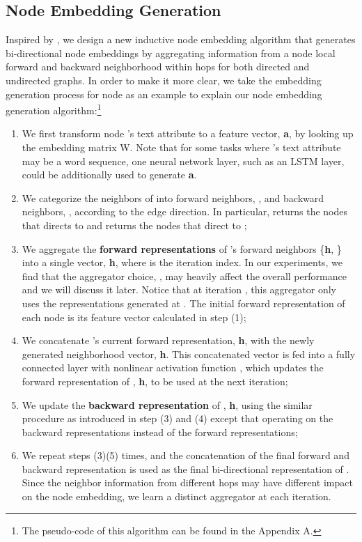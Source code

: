 \documentclass{article} \usepackage{iclr2019_conference,times}
\begin{document}
\subsection{Node Embedding Generation}
Inspired by \cite{hamilton2017inductive}, we design a new inductive node embedding algorithm that generates bi-directional node embeddings by aggregating information from a node local forward and backward neighborhood within  hops for both directed and undirected graphs.
In order to make it more clear, we take the embedding generation process for node  as an example to explain our node embedding generation algorithm:\footnote{The pseudo-code of this algorithm can be found in the Appendix A.}
\begin{enumerate}[1)]
    \item We first transform node 's text attribute to a feature vector, \textbf{a}, by looking up the embedding matrix W. Note that for some tasks where 's text attribute may be a word sequence, one neural network layer, such as an LSTM layer, could be additionally used to generate \textbf{a}.
    \item We categorize the neighbors of  into forward neighbors, , and backward neighbors, , according to the edge direction. In particular,  returns the nodes that  directs to and  returns the nodes that direct to ;
    \item We aggregate the \textbf{forward representations} of 's forward neighbors \{\textbf{h}, \} into a single vector, \textbf{h}, where  is the iteration index.
    In our experiments, we find that the aggregator choice, , may heavily affect the overall performance and we will discuss it later.
    Notice that at iteration , this aggregator only uses the representations generated at . The initial forward representation of each node is its feature vector calculated in step (1);
    \item We concatenate 's current forward representation, \textbf{h}, with the newly generated neighborhood vector, \textbf{h}. This concatenated vector is fed into a fully connected layer with nonlinear activation function , which updates the forward representation of , \textbf{h}, to be used at the next iteration;
    \item We update the \textbf{backward representation} of , \textbf{h}, using the similar procedure as introduced in step (3) and (4) except that operating on the backward representations instead of the forward representations;
    \item We repeat steps (3)(5)  times, and the concatenation of the final forward and backward representation is used as the final bi-directional representation of . Since the neighbor information from different hops may have different impact on the node embedding, we learn a distinct aggregator at each iteration.
\end{enumerate}
\end{document}
